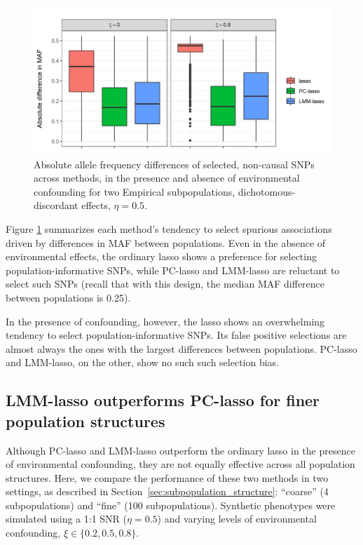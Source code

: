 \begin{figure}[H]
\centering
\includegraphics[scale = 0.9]{figures/pop_inf_snps_box.png}
\caption{Absolute allele frequency differences of selected, non-causal SNPs across methods, in the presence and absence of environmental confounding for two Empirical subpopulations, dichotomous-discordant effects, $\eta = 0.5$.}
\label{fig:pop_inf}
\end{figure}

Figure \ref{fig:pop_inf} summarizes each method's tendency to select spurious associations driven by differences in MAF between populations.  Even in the absence of environmental effects, the ordinary lasso shows a preference for selecting population-informative SNPs, while PC-lasso and LMM-lasso are reluctant to select such SNPs (recall that with this design, the median MAF difference between populations is 0.25).

In the presence of confounding, however, the lasso shows an overwhelming tendency to select population-informative SNPs.  Its false positive selections are almost always the ones with the largest differences between populations.  PC-lasso and LMM-lasso, on the other, show no such such selection bias.


\subsection{LMM-lasso outperforms PC-lasso for finer population structures}
\label{sec:sim-fine-coarse}

Although PC-lasso and LMM-lasso outperform the ordinary lasso in the presence of environmental confounding, they are not equally effective across all population structures.  Here, we compare the performance of these two methods in two settings, as described in Section~\ref{sec:subpopulation_structure}: ``coarse'' (4 subpopulations) and ``fine'' (100 subpopulations).  Synthetic phenotypes were simulated using a 1:1 SNR ($\eta = 0.5$) and varying levels of environmental confounding, $\xi \in \{0.2, 0.5,0.8\}$. 

